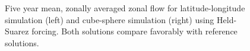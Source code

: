 \begin{figure}
 \begin{center}
 \end{center}
\caption{Five year mean, zonally averaged zonal flow for latitude-longitude
simulation (left) and cube-sphere simulation (right) using Held-Suarez
forcing. Both solutions compare favorably with reference solutions.}
\label{fig:hs_zave_u}
\end{figure}
